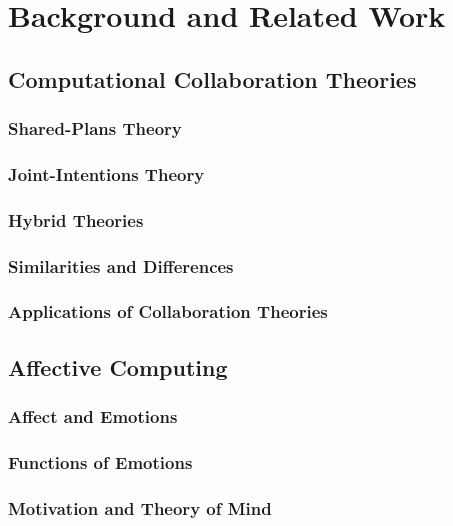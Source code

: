 \documentclass[12pt]{report}
\begin{document}
\chapter{Background and Related Work}
\label{ch:background}

\section{Computational Collaboration Theories}

\subsection{Shared-Plans Theory}

\subsection{Joint-Intentions Theory}

\subsection{Hybrid Theories}

\subsection{Similarities and Differences}

\subsection{Applications of Collaboration Theories}

\section{Affective Computing}

\subsection{Affect and Emotions}

\subsection{Functions of Emotions}

\subsection{Motivation and Theory of Mind}
\end{document}
